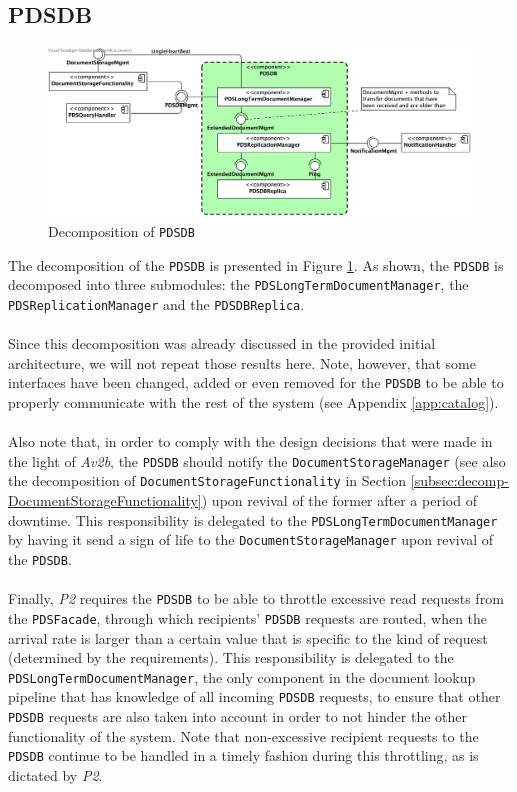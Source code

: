 \documentclass[a4paper,10pt]{article}
\begin{document}
\subsection{PDSDB}\label{subsec:decomp-PDSDB}
\begin{figure}[!htp]
	\centering
	\includegraphics[height=0.8\textheight]{PDSDB.png}
	\caption{Decomposition of \texttt{PDSDB}}
	\label{fig:decomp-PDSDB}
\end{figure}
\FloatBarrier
\noindent
The decomposition of the \texttt{PDSDB} is presented in Figure \ref{fig:decomp-PDSDB}. As shown, the \texttt{PDSDB} is decomposed into three submodules: the \texttt{PDSLongTermDocumentManager}, the \texttt{PDSReplicationManager} and the \texttt{PDSDBReplica}.\\\\
Since this decomposition was already discussed in the provided initial architecture, we will not repeat those results here. Note, however, that some interfaces have been changed, added or even removed for the \texttt{PDSDB} to be able to properly communicate with the rest of the system (see Appendix \ref{app:catalog}).\\\\
Also note that, in order to comply with the design decisions that were made in the light of \textit{Av2b}, the \texttt{PDSDB} should notify the \texttt{DocumentStorageManager} (see also the decomposition of \texttt{DocumentStorageFunctionality} in Section \ref{subsec:decomp-DocumentStorageFunctionality}) upon revival of the former after a period of downtime. This responsibility is delegated to the \texttt{PDSLongTermDocumentManager} by having it send a sign of life to the \texttt{DocumentStorageManager} upon revival of the \texttt{PDSDB}.\\\\
Finally, \textit{P2} requires the \texttt{PDSDB} to be able to throttle excessive read requests from the \texttt{PDSFacade}, through which recipients' \texttt{PDSDB} requests are routed, when the arrival rate is larger than a certain value that is specific to the kind of request (determined by the requirements). This responsibility is delegated to the \texttt{PDSLongTermDocumentManager}, the only component in the document lookup pipeline that has knowledge of all incoming \texttt{PDSDB} requests, to ensure that other \texttt{PDSDB} requests are also taken into account in order to not hinder the other functionality of the system. Note that non-excessive recipient requests to the \texttt{PDSDB} continue to be handled in a timely fashion during this throttling, as is dictated by \textit{P2}.
\end{document}
